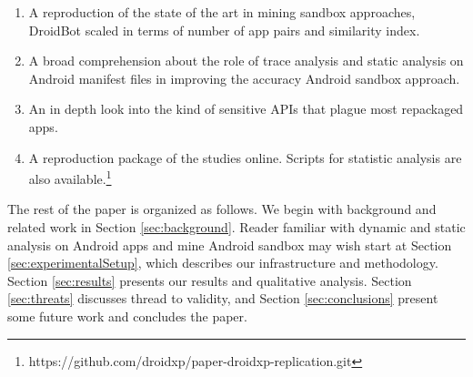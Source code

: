 \begin{enumerate}[1.]
\item A reproduction of the state of the art in mining sandbox approaches, DroidBot scaled in terms of number of app pairs and similarity index.
\item A broad comprehension about the role of trace analysis and static analysis on Android manifest files in improving the accuracy Android sandbox approach.
\item An in depth look into the kind of sensitive APIs that plague most repackaged apps.
\item A reproduction package of the studies online. Scripts for statistic analysis are also available.\footnote{https://github.com/droidxp/paper-droidxp-replication.git}
\end{enumerate}


The rest of the paper is organized as follows. We begin with background and related work in Section \ref{sec:background}. Reader familiar with dynamic and static analysis on Android apps and mine Android sandbox may wish start at Section \ref{sec:experimentalSetup}, which describes our infrastructure and methodology. Section \ref{sec:results} presents our results and qualitative analysis. Section \ref{sec:threats} discusses thread to validity, and Section \ref{sec:conclusions} present some future work and concludes the paper.




